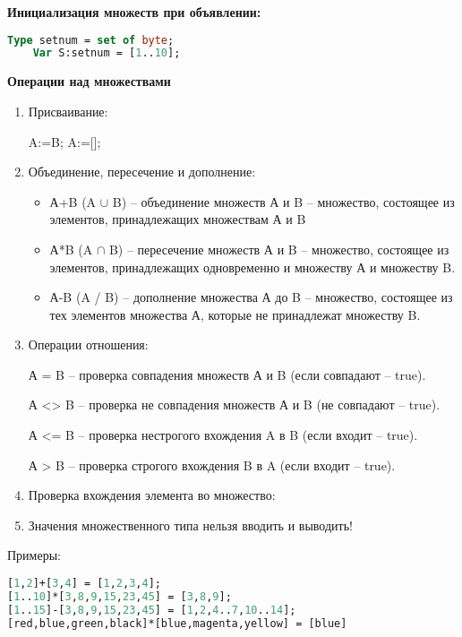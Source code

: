 {\bf{Инициализация множеств при объявлении:}}
\begin{lstlisting}[language=Pascal]
	Type setnum = set of byte;
	Var S:setnum = [1..10]; 
\end{lstlisting}

{\bf{Операции над множествами}}
\begin{enumerate}
\item Присваивание:

	A:=B;
	A:=[];

\item Объединение, пересечение и дополнение:

\begin{itemize}
\item А+B (A $\cup$ B) – объединение  множеств А и B – множество, состоящее из элементов, принадлежащих множествам А и B
\item А*B (A $\cap$ B) – пересечение множеств А и B – множество, состоящее из элементов, принадлежащих одновременно и множеству А и  множеству B.
\item А-B (A / B) – дополнение  множества А до B – множество, состоящее 	из тех элементов множества А, которые не принадлежат  множеству B.
\end{itemize}


\item Операции отношения:

А = B – проверка совпадения множеств А и B (если совпадают – true).

А <> B – проверка не совпадения множеств А и B (не совпадают – true).

А <= B – проверка нестрогого вхождения A в B (если входит – true).

А > B – проверка строгого вхождения B в A (если входит – true). 

\item Проверка вхождения элемента во множество:
 
\item Значения множественного типа нельзя вводить и выводить!

\end{enumerate}
Примеры:
\begin{lstlisting}[language=Pascal]
[1,2]+[3,4] = [1,2,3,4];
[1..10]*[3,8,9,15,23,45] = [3,8,9];
[1..15]-[3,8,9,15,23,45] = [1,2,4..7,10..14];
[red,blue,green,black]*[blue,magenta,yellow] = [blue]
\end{lstlisting}

